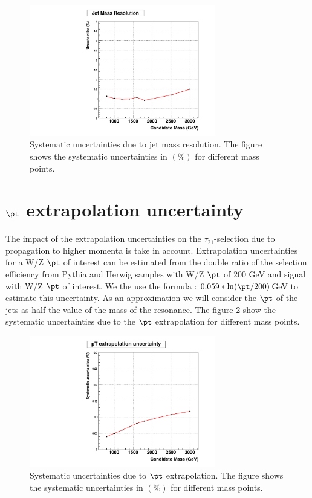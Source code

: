 \begin{figure}[!ht]
\caption{ Systematic uncertainties due to jet mass resolution. The figure shows the systematic uncertainties in $(\%)$ for different mass points.}
\begin{center}
  \includegraphics[width=230pt]{figures/SystUncert/JetMassRes.pdf}
\end{center}
\label{fig:massres}
\end{figure}

\section{$\pt$ extrapolation uncertainty}

The impact of the extrapolation uncertainties on the $\tau_{21}$-selection due to propagation to higher momenta is take in account. Extrapolation uncertainties for a W/Z $\pt$ of interest can be estimated from the double ratio of the selection efficiency from Pythia and Herwig samples with W/Z  $\pt$ of 200 GeV and signal with W/Z $\pt$ of interest. We the use the formula : $0.059*\ln(\pt/200)$GeV to estimate this uncertainty. As an approximation we will consider the $\pt$ of the jets as half the value of the mass of the resonance.
The figure \ref{fig:ptextra} show the systematic uncertainties due to the $\pt$ extrapolation for different mass points.

\begin{figure}[!ht]
\caption{ Systematic uncertainties due to $\pt$ extrapolation. The figure shows the systematic uncertainties in $(\%)$ for different mass points.}
\begin{center}
  \includegraphics[width=230pt]{figures/SystUncert/ptextra.pdf}
\end{center}
\label{fig:ptextra}
\end{figure}

